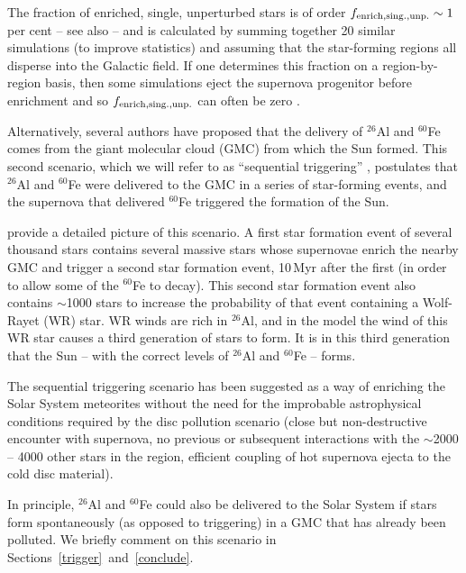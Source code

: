 \documentclass[useAMS,usenatbib,usegraphicx]{mn2e}
\begin{document}
The fraction of enriched, single, unperturbed stars is of order $f_{\rm enrich, sing., unp.} \sim 1$\,per cent \citep{Parker14a} -- see also \citet*{Adams14} -- and is calculated by summing together 20 similar simulations (to improve statistics) and assuming that the star-forming regions all disperse into the Galactic field. If one determines this fraction on a region-by-region basis, then some simulations eject the supernova progenitor before enrichment \citep[due to multiple interactions with other massive stars, e.g.][]{Allison11,Oh15} and so $f_{\rm enrich, sing., unp.}$ can often be zero \citep[see also][]{Gounelle08,Adams14}.

Alternatively, several authors have proposed that the delivery of  $^{26}$Al and $^{60}$Fe comes from the giant molecular cloud (GMC) from which the Sun formed. This second scenario, which we will refer to as ``sequential triggering'' \citep{Gaidos09,Gounelle09,Gounelle12,Gritschneder12,Gounelle15}, postulates that $^{26}$Al and $^{60}$Fe were delivered to the GMC in a series of star-forming events, and the supernova that delivered  $^{60}$Fe triggered the formation of the Sun. 

\citet{Gounelle12} provide a detailed picture of this scenario. A first star formation event of several thousand stars contains several massive stars whose supernovae enrich the nearby GMC and trigger a second star formation event, 10\,Myr after the first (in order to allow some of the $^{60}$Fe to decay). This second star formation event also contains $\sim$1000 stars to increase the probability of that event containing a Wolf-Rayet (WR) star. WR winds are rich in $^{26}$Al, and in the \citet{Gounelle12} model the wind of this WR star causes a third generation of stars to form. It is in this third generation that the Sun -- with the correct levels of $^{26}$Al and $^{60}$Fe -- forms. 

The sequential triggering scenario has been suggested as a way of enriching the Solar System meteorites without the need for the improbable astrophysical conditions required by the disc pollution scenario (close but non-destructive encounter with supernova, no previous or subsequent interactions with the $\sim$2000 -- 4000 other stars in the region, efficient coupling of hot supernova ejecta to the cold disc material). 

In principle,  $^{26}$Al and $^{60}$Fe could also be delivered to the Solar System if stars form spontaneously (as opposed to triggering) in a GMC that has already been polluted. We briefly comment on this scenario in Sections~\ref{trigger}~and~\ref{conclude}.
\end{document}
